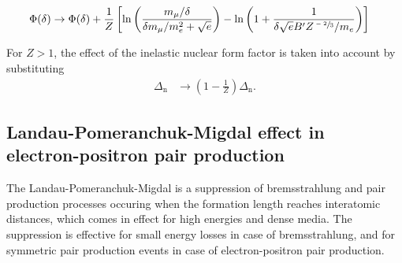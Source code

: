 \begin{align}
	\Phi(\delta) &\rightarrow \Phi(\delta) + \frac{1}{Z} \left[ \ln\left( \frac{m_\mu / \delta}{\delta m_\mu / m_e^2 + \sqrt{e}} \right) - \ln\left( 1 + \frac{1}{\delta \sqrt{e} B^\prime Z^{\sfrac{-2}{3}} / m_e} \right) \right]
\end{align}

For $Z > 1$, the effect of the inelastic nuclear form factor is taken into account by substituting
%
\begin{align}
	\Delta_\text{n} &\rightarrow \left( 1 - \frac{1}{Z} \right) \Delta_\text{n}.
\end{align}

\subsection{Landau-Pomeranchuk-Migdal effect in electron-positron pair production}

The Landau-Pomeranchuk-Migdal is a suppression of bremsstrahlung and pair production processes occuring when the formation length reaches interatomic distances, which comes in effect for high energies and dense media.
The suppression is effective for small energy losses in case of bremsstrahlung, and for symmetric pair production events in case of electron-positron pair production.

